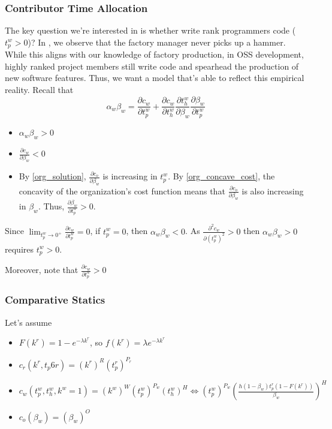 \documentclass[../main.tex]{subfiles}
\begin{document}
\subsubsection{Contributor Time Allocation}
The key question we're interested in is whether write rank programmers code ($t_p^w>0$)? In \cite{garicano_hierarchies_2000}, we observe that the factory manager never picks up a hammer. While this aligns with our knowledge of factory production, in OSS development, highly ranked project members still write code and spearhead the production of new software features. Thus, we want a model that's able to reflect this empirical reality. 
Recall that $$\alpha_w \beta_w = \frac{\partial c_w}{\partial t_p^w} + \frac{\partial c_w}{\partial t_h^w}\frac{\partial t_h^w}{\partial \beta_w}\frac{\partial \beta_w}{\partial t_p^w}$$
\begin{itemize}
    \item $\alpha_w \beta_w>0$ 
    \item $\frac{\partial c_w}{\partial \beta_w} < 0$
    \item By \ref{org_solution}, $\frac{\partial c_o}{\partial \beta_w}$ is increasing in $t_p^w$. By \ref{org_concave_cost}, the concavity of the organization's cost function means that $\frac{\partial c_o}{\partial \beta_w}$ is also increasing in $\beta_w$. Thus, $\frac{\partial \beta_w}{\partial t_p^w} > 0$.
\end{itemize}
Since $\lim_{t_p^w \to 0^+} \frac{\partial c_w}{\partial t_p^w} = 0$, if $t_p^w = 0$, then $\alpha_w\beta_w < 0$. As $\frac{\partial^2 c_w}{\partial (t_p^w)^2}>0$ then $\alpha_w \beta_w>0$ requires $t_p^w>0$. 

Moreover, note that $\frac{\partial c_w}{\partial t_p^w}>0$

\subsubsection{Comparative Statics}
Let's assume
\begin{itemize}
    \item $F(k^r) = 1-e^{-\lambda k^r}$, so $f(k^r) = \lambda e^{-\lambda k^r}$
    \item $c_r(k^r, t_p6r) = (k^r)^R(t_p^r)^{P_r}$
    \item $c_w(t_p^w, t_h^w,k^w=1) = (k^w)^W(t_p^w)^{P_w}(t_h^w)^H \iff  (t_p^w)^{P_w}(\frac{h (1-\beta_w) t_p^r(1-F(k^r))}{\beta_w})^H $
    \item $c_o(\beta_w) = (\beta_w)^O $

\end{itemize}
\end{document}
